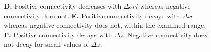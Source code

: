 \begin{figure}
\begin{fullpage}
\begin{caption}
{\bf D.} Positive connectivity decreases with $\Delta ori$ whereas negative connectivity does not.
{\bf E.} Positive connectivity decays with $\Delta x$ whereas negative connectivity does not, within the examined range.
{\bf F.} Positive connectivity decays with $\Delta z$. Negative connectivity does not decay for small values of $\Delta z$.

\end{caption} \label{fig:6}

\end{fullpage}
\end{figure}
